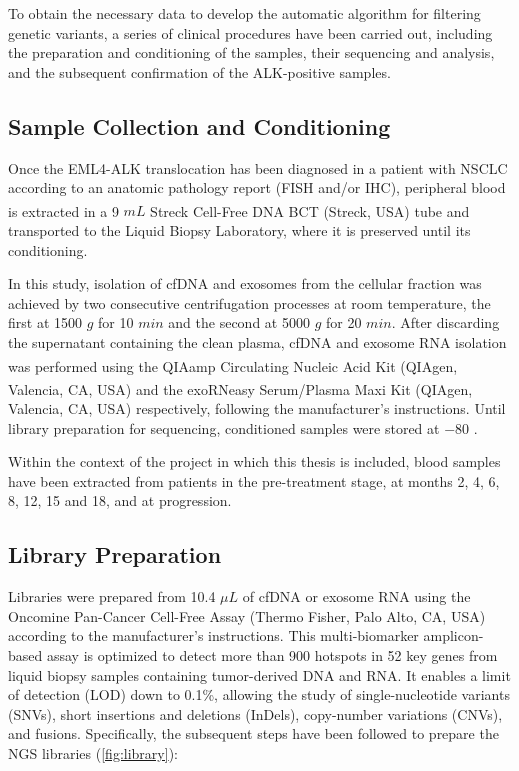 To obtain the necessary data to develop the automatic algorithm for filtering genetic variants, a series of clinical procedures have been carried out, including the preparation and conditioning of the samples, their sequencing and analysis, and the subsequent confirmation of the ALK-positive samples.

\subsection{Sample Collection and Conditioning}

Once the EML4-ALK translocation has been diagnosed in a patient with NSCLC according to an anatomic pathology report (FISH and\slash or IHC), peripheral blood is extracted in a 9 $mL$ Streck Cell-Free DNA BCT\textsuperscript\textregistered{} (Streck, USA) tube and transported to the Liquid Biopsy Laboratory, where it is preserved until its conditioning.

In this study, isolation of cfDNA and exosomes from the cellular fraction was achieved by two consecutive centrifugation processes at room temperature, the first at 1500 $g$ for 10 $min$ and the second at 5000 $g$ for 20 $min$. After discarding the supernatant containing the clean plasma, cfDNA and exosome RNA isolation was performed using the QIAamp\textsuperscript\textregistered{} Circulating Nucleic Acid Kit (QIAgen, Valencia, CA, USA) and the exoRNeasy\textsuperscript\textregistered{} Serum/Plasma Maxi Kit (QIAgen, Valencia, CA, USA) respectively, following the manufacturer's instructions. Until library preparation for sequencing, conditioned samples were stored at $-80$ .

Within the context of the project in which this thesis is included, blood samples have been extracted from patients in the pre-treatment stage, at months 2, 4, 6, 8, 12, 15 and 18, and at progression.

\subsection{Library Preparation}

Libraries were prepared from 10.4 $\mu L$ of cfDNA or exosome RNA using the Oncomine\texttrademark{} Pan-Cancer Cell-Free Assay (Thermo Fisher, Palo Alto, CA, USA) according to the manufacturer's instructions. This multi-biomarker amplicon-based assay is optimized to detect more than 900 hotspots in 52 key genes from liquid biopsy samples containing tumor-derived DNA and RNA. It enables a limit of detection (LOD) down to 0.1\%, allowing the study of single-nucleotide variants (SNVs), short insertions and deletions (InDels), copy-number variations (CNVs), and fusions. Specifically, the subsequent steps have been followed to prepare the NGS libraries (\autoref{fig:library}):

